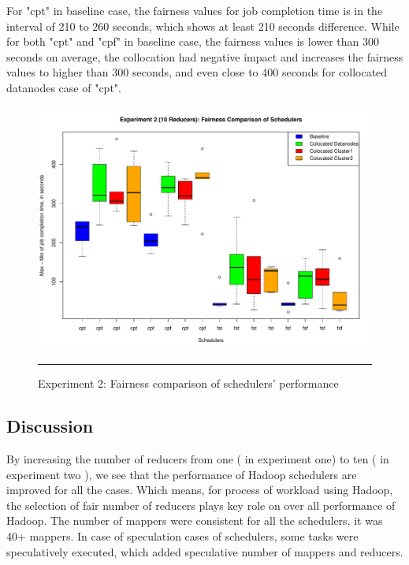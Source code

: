 
 
  For "cpt" in baseline case, the fairness values for job completion time is in the interval of 210 to 260 seconds, which shows at least 210 seconds difference. While for both "cpt" and "cpf" in baseline case, the fairness values is lower than 300 seconds on average, the collocation had negative impact and increases the fairness values to higher than 300 seconds, and even close to 400 seconds for collocated datanodes case of "cpt".
 
 
 \begin{figure}[htbp]
  \centering
    \includegraphics[width=\textwidth,height=\textheight,keepaspectratio]{./Figures/exp_2_max-min.pdf}
    \rule{35em}{0.5pt}
  \caption{Experiment 2: Fairness comparison of schedulers' performance }
  \label{fig:exp_2_max-min}
\end{figure} 
  

\subsection{Discussion}

By increasing the number of reducers from one ( in experiment one) to ten ( in experiment two ), we see that the performance of Hadoop schedulers are improved for all the cases. Which means, for process of workload using Hadoop, the selection of fair number of reducers plays key role on over all performance of Hadoop. The number of mappers were consistent for all the schedulers, it was 40+ mappers. In case of speculation cases of schedulers, some tasks were speculatively executed, which added speculative number of mappers and reducers. \\


